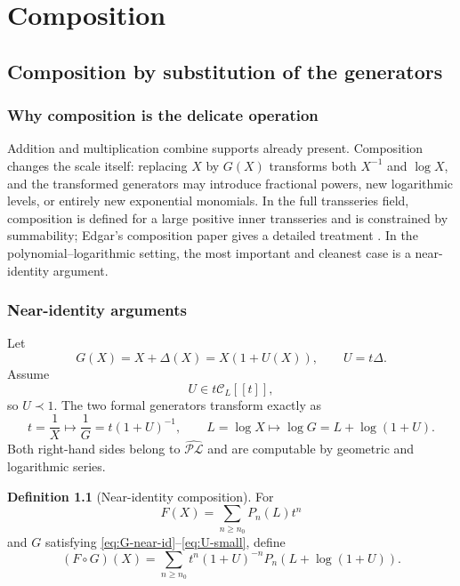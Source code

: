 \documentclass[11pt,oneside]{book}
\theoremstyle{definition}
\newtheorem{definition}[theorem]{Definition}
\theoremstyle{remark}
\newcommand{\PLfield}{\widehat{\mathscr{PL}}}
\newcommand{\precdom}{\prec}
\newcommand{\compose}{\mathbin{\circ}}
\begin{document}
\part{Composition}

\chapter{Composition by substitution of the generators}
\label{ch:composition-generators}

\section{Why composition is the delicate operation}
Addition and multiplication combine supports already present.  Composition
changes the scale itself: replacing $X$ by $G(X)$ transforms both
$X^{-1}$ and $\log X$, and the transformed generators may introduce
fractional powers, new logarithmic levels, or entirely new exponential
monomials.  In the full transseries field, composition is defined for a large
positive inner transseries and is constrained by summability; Edgar's
composition paper gives a detailed treatment \cite{EdgarComposition}.  In the
polynomial--logarithmic setting, the most important and cleanest case is a
near-identity argument.

\section{Near-identity arguments}
Let
\begin{equation}\label{eq:G-near-id}
 G(X)=X+\Delta(X)=X(1+U(X)),
 \qquad U=t\Delta.
\end{equation}
Assume
\begin{equation}\label{eq:U-small}
 U\in t\mathcal C_L[[t]],
\end{equation}
so $U\precdom1$.  The two formal generators transform exactly as
\begin{equation}\label{eq:generator-substitution}
 t=\frac1X\longmapsto
 \frac1G=t(1+U)^{-1},
 \qquad
 L=\log X\longmapsto
 \log G=L+\log(1+U).
\end{equation}
Both right-hand sides belong to $\PLfield$ and are computable by geometric
and logarithmic series.

\begin{definition}[Near-identity composition]
For
\[
 F(X)=\sum_{n\ge n_0}P_n(L)t^n
\]
and $G$ satisfying \eqref{eq:G-near-id}--\eqref{eq:U-small}, define
\begin{equation}\label{eq:composition-generator-formula}
 (F\compose G)(X)
 =\sum_{n\ge n_0}
 t^n(1+U)^{-n}
 P_n\!\left(L+\log(1+U)\right).
\end{equation}
\end{definition}
\end{document}
